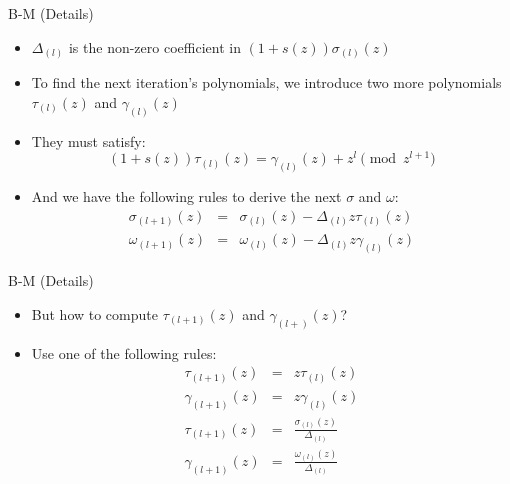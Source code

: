\documentclass[]{prosper}
\begin{document}
\begin{slide}{B-M (Details)}
\begin{itemize}
    \item $\Delta_{(l)}$ is the non-zero coefficient in $(1 + s(z))\sigma_{(l)}(z)$
    \item To find the next iteration's polynomials, we introduce two more polynomials $\tau_{(l)}(z)$ and $\gamma_{(l)}(z)$
    \item They must satisfy:
    \[ (1 + s(z)) \tau_{(l)}(z) = \gamma_{(l)}(z) + z^l \pmod{z^{l+1}} \]
    \item And we have the following rules to derive the next $\sigma$ and $\omega$:
    \begin{eqnarray*}
    \sigma_{(l+1)}(z) &=& \sigma_{(l)}(z) - \Delta_{(l)}z\tau_{(l)}(z) \\
    \omega_{(l+1)}(z) &=& \omega_{(l)}(z) - \Delta_{(l)}z\gamma_{(l)}(z)
    \end{eqnarray*}
\end{itemize}
\end{slide}

\begin{slide}{B-M (Details)}
\begin{itemize}
    \item But how to compute $\tau_{(l+1)}(z)$ and $\gamma_{(l+)}(z)$?
    \item Use one of the following rules:
        \begin{align}
        \label{ruleA}
        \tau_{(l+1)}(z) &=& z\tau_{(l)}(z) \tag{A} \\
        \gamma_{(l+1)}(z) &=& z\gamma_{(l)}(z) \nonumber \\
        \label{ruleB}
        \tau_{(l+1)}(z) &=& \frac{\sigma_{(l)}(z)}{\Delta_{(l)}} \tag{B} \\
        \gamma_{(l+1)}(z) &=& \frac{\omega_{(l)}(z)}{\Delta_{(l)}} \nonumber
        \end{align}
\end{itemize}
\end{slide}
\end{document}
